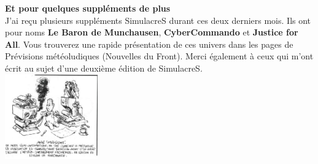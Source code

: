 \documentclass[11pt,twoside,a4paper]{article}
\begin{document}
\begin{multicols}{3}
{\textbf{Et pour quelques suppl{\'e}ments de plus}~\\

J'ai re\c{c}u plusieurs suppl{\'e}ments SimulacreS durant ces deux derniers mois. Ils ont pour noms \textbf{Le Baron de Munchausen}, \textbf{CyberCommando} et \textbf{Justice for All}. Vous trouverez une rapide pr{\'e}sentation de ces univers dans les pages de Pr{\'e}visions m{\'e}t{\'e}oludiques (Nouvelles du Front). Merci {\'e}galement {\`a} ceux qui m'ont {\'e}crit au sujet d'une deuxi{\`e}me {\'e}dition de SimulacreS.~\\

\includegraphics[width=0.30\textwidth]{img/barbarismeScientifique.jpg}

} %
\end{multicols}

\clearpage
\end{document}
